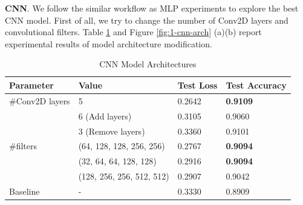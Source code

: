 \documentclass{article}
\begin{document}
\par
\noindent\textbf{CNN}. We follow the similar workflow as MLP experiments to explore the best CNN model. First of all, we try to change the number of Conv2D layers and convolutional filters. Table \ref{tab:1-ma-cnn} and Figure \ref{fig:1-cnn-arch} (a)(b) report experimental results of model architecture modification.
\begin{table}[!ht]
    \centering
    \caption{CNN Model Architectures}
    \label{tab:1-ma-cnn}
    \begin{tabular}{llll}
        \toprule
        \textbf{Parameter} & \textbf{Value} & \textbf{Test Loss} & \textbf{Test Accuracy}\\
        \midrule
        \#Conv2D layers & 5 & 0.2642 & \textbf{0.9109}\\
                        & 6 (Add layers) & 0.3105 & 0.9060\\
                        & 3 (Remove layers) & 0.3360 & 0.9101\\
        \midrule
        \#filters & (64, 128, 128, 256, 256) & 0.2767 & \textbf{0.9094}\\
                  & (32, 64, 64, 128, 128) & 0.2916 & \textbf{0.9094}\\
                  & (128, 256, 256, 512, 512) & 0.2907 & 0.9042\\
        \midrule
        Baseline & - & 0.3330 & 0.8909\\
        \bottomrule
    \end{tabular}
\end{table}
\end{document}
